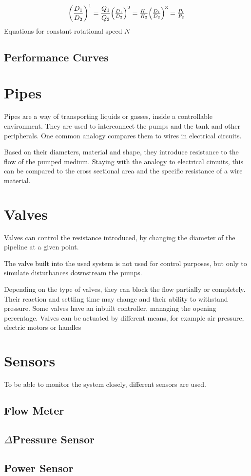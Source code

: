 \begin{equation}
	\left(\frac{D_1}{D_2}\right)^1 = \frac{Q_1}{Q_2}$$
	
	$$\left(\frac{D_1}{D_2}\right)^2 = \frac{H_1}{H_2}$$
	
	$$\left(\frac{D_1}{D_2}\right)^3 = \frac{P_1}{P_2}	
\end{equation} Equations for constant rotational speed $N$ \cite{AffinityLaws}


\subsection{Performance Curves}

\section{Pipes}
Pipes are a way of transporting liquids or gasses, inside a controllable environment.
They are used to interconnect the pumps and the tank and other peripherals.
One common analogy compares them to wires in electrical circuits.

Based on their diameters, material and shape,
they introduce resistance to the flow of the pumped medium.
Staying with the analogy to electrical circuits,
this can be compared to the cross sectional area and the specific resistance of a wire material.

\section{Valves}
Valves can control the resistance introduced, by changing the diameter of the pipeline at a given point. 

The valve built into the used system is not used for control purposes,
but only to simulate disturbances downstream the pumps.

Depending on the type of valves, they can block the flow partially or completely.
Their reaction and settling time may change and their ability to withstand pressure.
Some valves have an inbuilt controller, managing the opening percentage.
Valves can be actuated by different means, for example air pressure, electric motors or handles

\section{Sensors}
To be able to monitor the system closely, different sensors are used.

\subsection{Flow Meter}
\subsection{$\Delta$Pressure Sensor}
\subsection{Power Sensor}

